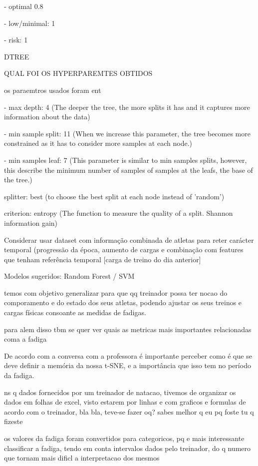 \documentclass[conference]{IEEEtran}
\begin{document}
   - optimal 0.8

   - low/minimal: 1

   - risk: 1

DTREE

QUAL FOI OS HYPERPAREMTES OBTIDOS


os paraemtros usados foram ent

- max depth: 4 (The deeper the tree, the more splits it has and it captures more information about the data)

- min sample split: 11 (When we increase this parameter, the tree becomes more constrained as it has to consider more samples at each node.)

- min samples leaf: 7 (This parameter is similar to min samples splits, however, this describe the minimum number of samples of samples at the leafs, the base of the tree.)

splitter: best (to choose the best split at each node instead of 'random')

criterion: entropy (The function to measure the quality of a split. Shannon information gain)


Considerar usar dataset com informação combinada de atletas para reter carácter temporal (progressão da época, aumento de cargas e combinação com features que tenham referência temporal [carga de treino do dia anterior]

Modelos sugeridos: Random Forest / SVM

temos com objetivo generalizar para que qq treinador possa ter nocao do comporamento e do estado dos seus atletas, podendo ajustar os seus treinos e cargas físicas consoante as medidas de fadigas.

para alem disso tbm se quer ver quais as metricas mais importantes relacionadas coma a fadiga

De acordo com a conversa com a professora é importante perceber como é que se deve definir a memória da nossa t-SNE, e a importância que isso tem no período da fadiga.

ns q dados fornecidos por um treinador de natacao, tivemos de organizar os dados em folhas de excel, visto estarem por linhas e com graficos e formulas de acordo com o treinador, bla bla, teve-se fazer oq? sabes melhor q eu pq foste tu q fizeste

os valores da fadiga foram convertidos para categoricos, pq e mais interessante classificar a fadiga, tendo em conta intervalos dados pelo treinador, do q numero que tornam mais dificl a interpretacao dos mesmos
\end{document}
